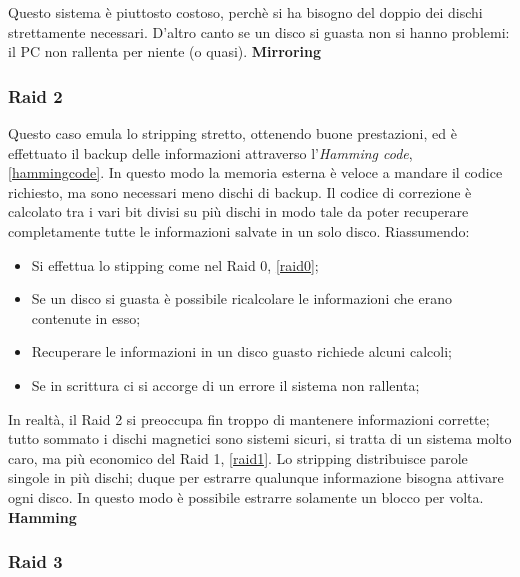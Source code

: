 \documentclass{article}
\begin{document}
Questo sistema è piuttosto costoso, perchè si ha bisogno del doppio dei dischi strettamente necessari. D'altro canto se un disco si guasta non si hanno problemi: il PC non rallenta per niente (o quasi). \textbf{Mirroring}

\subsubsection{Raid 2}
\label{raid2}
Questo caso emula lo stripping stretto, ottenendo buone prestazioni, ed è effettuato il backup delle informazioni attraverso l'\textit{Hamming code}, \autoref{hammingcode}. In questo modo la memoria esterna è veloce a mandare il codice richiesto, ma sono necessari meno dischi di backup. Il codice di correzione è calcolato tra i vari bit divisi su più dischi in modo tale da poter recuperare completamente tutte le informazioni salvate in un solo disco. Riassumendo:
\begin{itemize}
	\item Si effettua lo stipping come nel Raid 0, \autoref{raid0};

	\item Se un disco si guasta è possibile ricalcolare le informazioni che erano contenute in esso;

	\item Recuperare le informazioni in un disco guasto richiede alcuni calcoli;

	\item Se in scrittura ci si accorge di un errore il sistema non rallenta;
\end{itemize}

In realtà, il Raid 2 si preoccupa fin troppo di mantenere informazioni corrette; tutto sommato i dischi magnetici sono sistemi sicuri, si tratta di un sistema molto caro, ma più economico del Raid 1, \autoref{raid1}. Lo stripping distribuisce parole singole in più dischi; duque per estrarre qualunque informazione bisogna attivare ogni disco. In questo modo è possibile estrarre solamente un blocco per volta. \textbf{Hamming}

\subsubsection{Raid 3}
\label{raid3}
\end{document}
